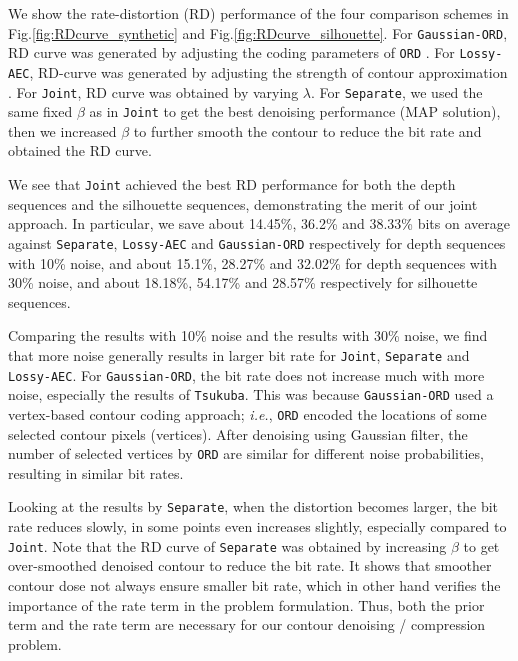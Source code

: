 We show the rate-distortion (RD) performance of the four comparison schemes in Fig.\;\ref{fig:RDcurve_synthetic} and Fig.\;\ref{fig:RDcurve_silhouette}.
For \texttt{Gaussian-ORD}, RD curve was generated by adjusting the coding parameters of \texttt{ORD} \cite{lai2010arbitrary}. 
For \texttt{Lossy-AEC}, RD-curve was generated by adjusting the strength of contour approximation \cite{yuan2015contour}.
For \texttt{Joint}, RD curve was obtained by varying $\lambda$.
For \texttt{Separate}, we used the same fixed $\beta$ as in \texttt{Joint} to get the best denoising performance (MAP solution), then we increased $\beta$ to further smooth the contour to reduce the bit rate and obtained the RD curve.

We see that \texttt{Joint} achieved the best RD performance for both the depth sequences and the silhouette sequences, demonstrating the merit of our joint approach.
In particular, we save about 14.45\%, 36.2\% and 38.33\% bits on average against \texttt{Separate}, \texttt{Lossy-AEC} and \texttt{Gaussian-ORD} respectively for depth sequences with 10\% noise, and about 15.1\%, 28.27\% and 32.02\% for depth sequences with 30\% noise, and about 18.18\%, 54.17\% and 28.57\% respectively for silhouette sequences. 

Comparing the results with 10\% noise and the results with 30\% noise, we find that more noise generally results in larger bit rate for \texttt{Joint}, \texttt{Separate} and \texttt{Lossy-AEC}.
For \texttt{Gaussian-ORD}, the bit rate does not increase much with more noise, especially the results of \texttt{Tsukuba}.
This was because \texttt{Gaussian-ORD} used a vertex-based contour coding approach; \textit{i.e.}, \texttt{ORD} encoded the locations of some selected contour pixels (vertices).
After denoising using Gaussian filter, the number of selected vertices by \texttt{ORD} are similar for different noise probabilities, resulting in similar bit rates. 

Looking at the results by \texttt{Separate}, when the distortion becomes larger, the bit rate reduces slowly, in some points even increases slightly, especially compared to \texttt{Joint}.
Note that the RD curve of \texttt{Separate} was obtained by increasing $\beta$ to get over-smoothed denoised contour to reduce the bit rate.
It shows that smoother contour dose not always ensure smaller bit rate, which in other hand verifies the importance of the rate term in the problem formulation.
Thus, both the prior term and the rate term are necessary for our contour denoising / compression problem.

